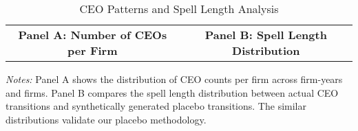 \begin{table}[htbp]
\centering
\caption{CEO Patterns and Spell Length Analysis}
\label{tab:ceo_patterns}

\centering
\begin{tabular}{cc}
    \begin{minipage}{0.45\textwidth}
        \textbf{Panel A: Number of CEOs per Firm}
        
    \end{minipage} &
    \begin{minipage}{0.45\textwidth}
        \textbf{Panel B: Spell Length Distribution}
        
    \end{minipage}
\end{tabular}

\begin{minipage}{12cm}
\footnotesize
\textit{Notes:} Panel A shows the distribution of CEO counts per firm across firm-years and firms. Panel B compares the spell length distribution between actual CEO transitions and synthetically generated placebo transitions. The similar distributions validate our placebo methodology.
\end{minipage}
\end{table}